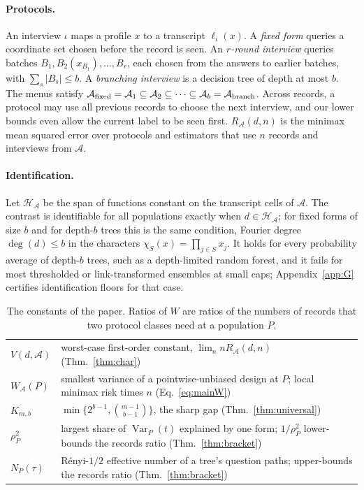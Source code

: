 \documentclass{article}
\newcommand{\Var}{\operatorname{Var}}
\newcommand{\A}{\mathcal A}
\newcommand{\Hh}{\mathcal H}
\begin{document}
\paragraph{Protocols.}
An interview $\iota$ maps a profile $x$ to a transcript $\ell_\iota(x)$. A \emph{fixed form} queries a coordinate set chosen before the record is seen. An \emph{$r$-round interview} queries batches $B_1,B_2(x_{B_1}),\ldots,B_r$, each chosen from the answers to earlier batches, with $\sum_s|B_s|\le b$. A \emph{branching interview} is a decision tree of depth at most $b$. The menus satisfy $\A_{\rm fixed}=\A_1\subseteq\A_2\subseteq\cdots\subseteq\A_b=\A_{\rm branch}$. Across records, a protocol may use all previous records to choose the next interview, and our lower bounds even allow the current label to be seen first. $R_\A(d,n)$ is the minimax mean squared error over protocols and estimators that use $n$ records and interviews from $\A$.

\paragraph{Identification.}
Let $\Hh_\A$ be the span of functions constant on the transcript cells of $\A$. The contrast is identifiable for all populations exactly when $d\in\Hh_\A$; for fixed forms of size $b$ and for depth-$b$ trees this is the same condition, Fourier degree $\deg(d)\le b$ in the characters $\chi_S(x)=\prod_{j\in S}x_j$. It holds for every probability average of depth-$b$ trees, such as a depth-limited random forest, and it fails for most thresholded or link-transformed ensembles at small caps; Appendix~\ref{app:G} certifies identification floors for that case.

\begin{table}[t]
\centering
\caption{The constants of the paper. Ratios of $W$ are ratios of the numbers of records that two protocol classes need at a population $P$.}
\label{tab:constants}
\footnotesize
\setlength{\tabcolsep}{2.5pt}
\begin{tabular}{lp{6.4cm}}
\toprule
$V(d,\A)$ & worst-case first-order constant, $\lim_n nR_\A(d,n)$ (Thm.~\ref{thm:char})\\
$W_\A(P)$ & smallest variance of a pointwise-unbiased design at $P$; local minimax risk times $n$ (Eq.~\ref{eq:mainW})\\
$K_{m,b}$ & $\min\{2^{b-1},\binom{m-1}{b-1}\}$, the sharp gap (Thm.~\ref{thm:universal})\\
$\rho_P^2$ & largest share of $\Var_P(t)$ explained by one form; $1/\rho_P^2$ lower-bounds the records ratio (Thm.~\ref{thm:bracket})\\
$N_P(\tau)$ & R\'enyi-$1/2$ effective number of a tree's question paths; upper-bounds the records ratio (Thm.~\ref{thm:bracket})\\
\bottomrule
\end{tabular}
\end{table}
\end{document}

